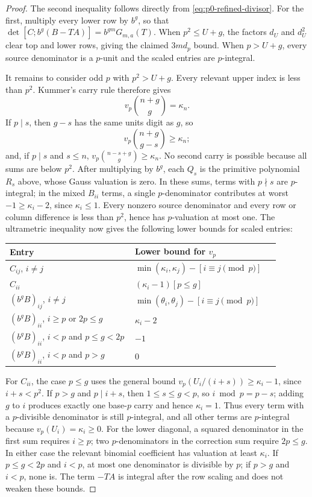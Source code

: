 \begin{proof}
The second inequality follows directly from
\eqref{eq:p0-refined-divisor}.  For the first, multiply every lower row by
$b^g$, so that
$\det[C;b^g(B-TA)]=b^{gm}G_{m,a}(T)$.  When $p^2\le U+g$, the factors
$d_U$ and $d_U^2$ clear top and lower rows, giving the claimed $3md_p$
bound.  When $p>U+g$, every source denominator is a $p$-unit and the scaled
entries are $p$-integral.

It remains to consider odd $p$ with $p^2>U+g$.  Every relevant upper index
is less than $p^2$.  Kummer's carry rule therefore gives
\[
 v_p\binom{n+g}{g}=\kappa_n.
\]
If $p\mid s$, then $g-s$ has the same units digit as $g$, so
\[
 v_p\binom{n+g}{g-s}\ge\kappa_n;
\]
 and, if $p\mid s$ and $s\le n$,
$v_p\binom{n-s+g}{g}\ge\kappa_n$.  No second carry is possible because
all sums are below $p^2$.  After multiplying by $b^g$, each $Q_s$ is the
primitive polynomial $R_s$ above, whose Gauss valuation is zero.  In these
sums, terms with $p\nmid s$ are $p$-integral; in the mixed
$B_{ii}$ terms, a single $p$-denominator contributes at worst
$-1\ge\kappa_i-2$, since $\kappa_i\le1$.  Every nonzero source denominator
and every row or column difference is less than
$p^2$, hence has $p$-valuation at most one.  The ultrametric inequality now
gives the following lower bounds for scaled entries:
\begin{center}
\renewcommand{\arraystretch}{1.12}
\normalsize
\begin{tabular}{@{}p{0.43\linewidth}p{0.46\linewidth}@{}}
\toprule
Entry & Lower bound for $v_p$ \\
\midrule
$C_{ij}$, $i\ne j$ & $\min(\kappa_i,\kappa_j)-[i\equiv j\pmod p]$ \\
$C_{ii}$ & $(\kappa_i-1)[p\le g]$ \\
$(b^gB)_{ij}$, $i\ne j$ & $\min(\theta_i,\theta_j)-[i\equiv j\pmod p]$ \\
$(b^gB)_{ii}$, $i\ge p$ or $2p\le g$ & $\kappa_i-2$ \\
$(b^gB)_{ii}$, $i<p$ and $p\le g<2p$ & $-1$ \\
$(b^gB)_{ii}$, $i<p$ and $p>g$ & $0$ \\
\bottomrule
\end{tabular}
\end{center}
For $C_{ii}$, the case $p\le g$ uses the general bound
$v_p(U_i/(i+s))\ge\kappa_i-1$, since $i+s<p^2$.  If $p>g$ and
$p\mid i+s$, then $1\le s\le g<p$, so $i\bmod p=p-s$; adding $g$ to
$i$ produces exactly one base-$p$ carry and hence $\kappa_i=1$.  Thus every
term with a $p$-divisible denominator is still $p$-integral, and all other
terms are $p$-integral because $v_p(U_i)=\kappa_i\ge0$.  For the lower diagonal, a squared denominator
in the first sum requires $i\ge p$; two $p$-denominators in the correction
sum require $2p\le g$.  In either case the relevant binomial coefficient
has valuation at least $\kappa_i$.  If $p\le g<2p$ and $i<p$, at most one
denominator is divisible by $p$; if $p>g$ and $i<p$, none is.  The term
$-TA$ is integral after the row scaling and does not weaken these bounds.


\end{proof}
